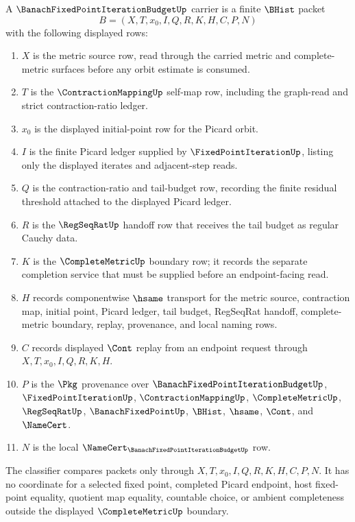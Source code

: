 \begin{definition}
\label{def:banach-fixed-point-iteration-carrier}
A $\BanachFixedPointIterationBudgetUp$ carrier is a finite $\BHist$ packet
$$
B=(X,T,x_0,I,Q,R,K,H,C,P,N)
$$
with the following displayed rows:
\begin{enumerate}
\item $X$ is the metric source row, read through the carried metric and complete-metric surfaces before any orbit estimate is consumed.
\item $T$ is the $\ContractionMappingUp$ self-map row, including the graph-read and strict contraction-ratio ledger.
\item $x_0$ is the displayed initial-point row for the Picard orbit.
\item $I$ is the finite Picard ledger supplied by $\FixedPointIterationUp$, listing only the displayed iterates and adjacent-step reads.
\item $Q$ is the contraction-ratio and tail-budget row, recording the finite residual threshold attached to the displayed Picard ledger.
\item $R$ is the $\RegSeqRatUp$ handoff row that receives the tail budget as regular Cauchy data.
\item $K$ is the $\CompleteMetricUp$ boundary row; it records the separate completion service that must be supplied before an endpoint-facing read.
\item $H$ records componentwise $\hsame$ transport for the metric source, contraction map, initial point, Picard ledger, tail budget, RegSeqRat handoff, complete-metric boundary, replay, provenance, and local naming rows.
\item $C$ records displayed $\Cont$ replay from an endpoint request through $X,T,x_0,I,Q,R,K,H$.
\item $P$ is the $\Pkg$ provenance over $\BanachFixedPointIterationBudgetUp$, $\FixedPointIterationUp$, $\ContractionMappingUp$, $\CompleteMetricUp$, $\RegSeqRatUp$, $\BanachFixedPointUp$, $\BHist$, $\hsame$, $\Cont$, and $\NameCert$.
\item $N$ is the local $\NameCert_{\BanachFixedPointIterationBudgetUp}$ row.
\end{enumerate}
The classifier compares packets only through $X,T,x_0,I,Q,R,K,H,C,P,N$. It has no coordinate for a selected fixed point, completed Picard endpoint, host fixed-point equality, quotient map equality, countable choice, or ambient completeness outside the displayed $\CompleteMetricUp$ boundary.
\end{definition}

